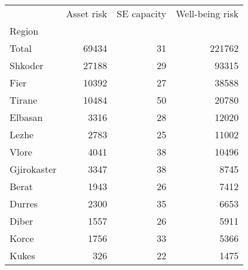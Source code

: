 \begin{tabular}{lrrr}
\toprule
{} &  Asset risk &  SE capacity &  Well-being risk \\
Region      &             &              &                  \\
\midrule
Total       &       69434 &           31 &           221762 \\
Shkoder     &       27188 &           29 &            93315 \\
Fier        &       10392 &           27 &            38588 \\
Tirane      &       10484 &           50 &            20780 \\
Elbasan     &        3316 &           28 &            12020 \\
Lezhe       &        2783 &           25 &            11002 \\
Vlore       &        4041 &           38 &            10496 \\
Gjirokaster &        3347 &           38 &             8745 \\
Berat       &        1943 &           26 &             7412 \\
Durres      &        2300 &           35 &             6653 \\
Diber       &        1557 &           26 &             5911 \\
Korce       &        1756 &           33 &             5366 \\
Kukes       &         326 &           22 &             1475 \\
\bottomrule
\end{tabular}
